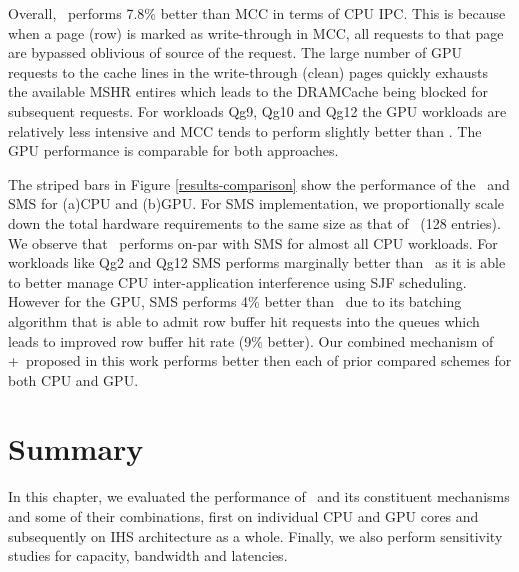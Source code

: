 \par Overall, \bypassname\ performs 7.8\% better than MCC in terms of CPU IPC. This is because when a page (row) is marked as write-through in MCC, all requests to that page are bypassed oblivious of source of the request. The large number of GPU requests to the cache lines in the write-through (clean) pages quickly exhausts the available MSHR entires which leads to the DRAMCache being blocked for subsequent requests. For workloads Qg9, Qg10 and Qg12 the GPU workloads are relatively less intensive and MCC tends to perform slightly better than \bypassname. The GPU performance is comparable for both approaches.
\par The striped bars in Figure \ref{results-comparison} show the performance of the \prioname\ and SMS for (a)CPU and (b)GPU. For SMS implementation, we proportionally scale down the total hardware requirements to the same size as that of \prioname\ (128 entries). We observe that \prioname\ performs on-par with SMS for almost all CPU workloads. For workloads like Qg2 and Qg12 SMS performs marginally better than \prioname\ as it is able to better manage CPU inter-application interference using SJF scheduling. However for the GPU, SMS performs 4\% better than \prioname\ due to its batching algorithm that is able to admit row buffer hit requests into the queues which leads to improved row buffer hit rate (9\% better). Our combined mechanism of \prioname+\bypassname\ proposed in this work performs better then each of prior compared schemes for both CPU and GPU.

\section{Summary}
In this chapter, we evaluated the performance of \cachename\ and its constituent mechanisms and some of their combinations, first on individual CPU and GPU cores and subsequently on IHS architecture as a whole. Finally, we also perform sensitivity studies for capacity, bandwidth and latencies.
